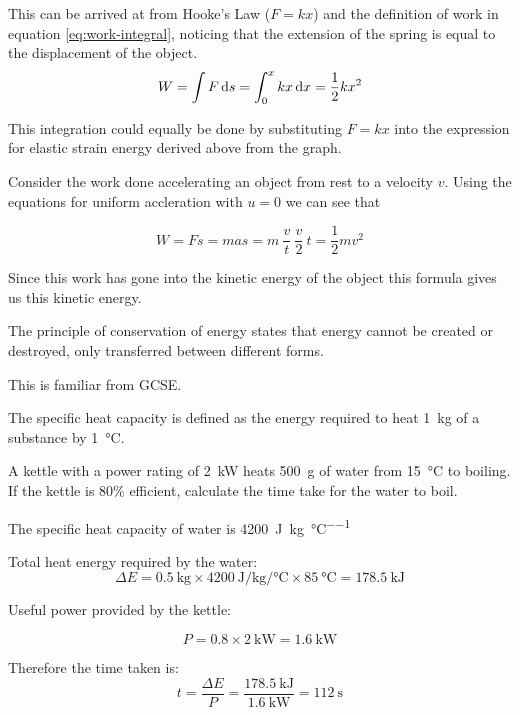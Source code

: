 \documentclass[revision-guide.tex]{subfiles}
\begin{document}

This can be arrived at from Hooke's Law ($F=kx$) and the definition of work in equation \ref{eq:work-integral}, noticing that the extension of the spring is equal to the displacement of the object.
\[ W = \int F \,\mathrm{d} s = \int_0^x kx \,\mathrm{d} x = \frac{1}{2}kx^2 \]

This integration could equally be done by substituting $F=kx$ into the expression for elastic strain energy derived above from the graph.


Consider the work done accelerating an object from rest to a velocity $v$. Using the equations for uniform accleration with $u=0$ we can see that

\[ W = Fs = mas = m\ \frac{v}{t}\ \frac{v}{2}\ t = \frac{1}{2}mv^2 \]

Since this work has gone into the kinetic energy of the object this formula gives us this kinetic energy.


The principle of conservation of energy states that energy cannot be created or destroyed, only transferred between different forms.


This is familiar from GCSE.


The specific heat capacity is defined as the energy required to heat \SI{1}{\kilo\gram} of a substance by \SI{1}{\celsius}.

\begin{example}
  A kettle with a power rating of \SI{2}{\kilo\watt} heats \SI{500}{\gram} of water from \SI{15}{\celsius} to boiling. If the kettle is 80\% efficient, calculate the time take for the water to boil.

  The specific heat capacity of water is \SI{4200}{\joule\per\kilogram\per\celsius}

  \answer

  Total heat energy required by the water:
  \[ \Delta E = \SI{0.5}{\kilogram} \times \SI{4200}{\joule\per\kilogram\per\celsius} \times \SI{85}{\celsius} = \SI{178.5}{\kilo\joule} \]

  Useful power provided by the kettle:

  \[ P = 0.8 \times \SI{2}{\kilo\watt} = \SI{1.6}{\kilo\watt} \]

  Therefore the time taken is:
  \[ t = \frac{\Delta E}{P} = \frac{\SI{178.5}{\kilo\joule}}{\SI{1.6}{\kilo\watt}} = \SI{112}{\second} \]

\end{example}
\end{document}
